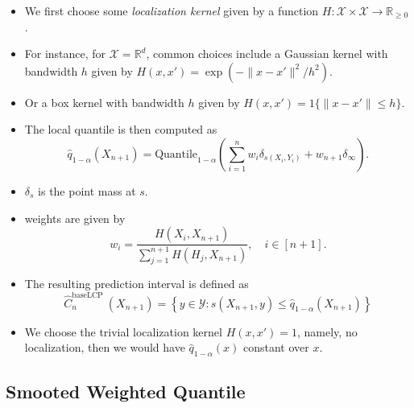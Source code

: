 \documentclass[UTF8, a4paper]{article}
\begin{document}
\begin{itemize}
  \item We first choose some {\it localization kernel} given by a function \(H: \mathcal{X} \times \mathcal{X} \rightarrow \mathbb{R}_{\geq 0}\).
  \item For instance, for \(\mathcal{X} = \mathbb{R}^d\), common choices include a Gaussian kernel with bandwidth \(h\) given by \(H(x, x') = \exp\left(-\|x - x'\|^2 / h^2\right)\).
  \item Or a box kernel with bandwidth \(h\) given by \(H(x, x') = 1\{ \|x - x'\| \leq h\}\).
  \item The local quantile is then computed as $$\widehat{q}_{1 - \alpha}(X_{n+1}) = \text{Quantile}_{1 - \alpha}\left(\sum_{i=1}^{n} w_i \delta_{s(X_i, Y_i)} + w_{n+1} \delta_{\infty}\right).$$
  \item \(\delta_s\) is the point mass at \(s\).
  \item weights are given by $$w_i = \frac{H(X_i, X_{n+1})}{\sum_{j=1}^{n+1}H(H_j, X_{n+1})}, \quad i \in [n+1].$$
  \item The resulting prediction interval is defined as $$
\widehat{C}_n^{\text {baseLCP }}\left(X_{n+1}\right)=\left\{y \in \mathcal{Y}: s\left(X_{n+1}, y\right) \leq \widehat{q}_{1-\alpha}\left(X_{n+1}\right)\right\}
$$
  \item We choose the trivial localization kernel \(H(x, x') = 1\), namely, no localization, then we would have \(\widehat{q}_{1 - \alpha}(x)\) constant over \(x\).
\end{itemize}


\subsection{Smooted Weighted Quantile}
\end{document}
